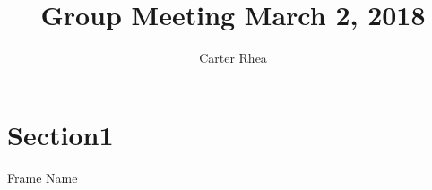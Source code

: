 \documentclass[10pt,svgnames,fragile]{beamer}
\subtitle{}
\institute[Duke University]{Civil and Environmental Engineering \\Duke University }
\author{Carter Rhea}
\date{}
\title{Group Meeting March 2, 2018}
\begin{document}
\maketitle




\section{Section1}
\begin{frame}{Frame Name}

\end{frame}
\end{document}
